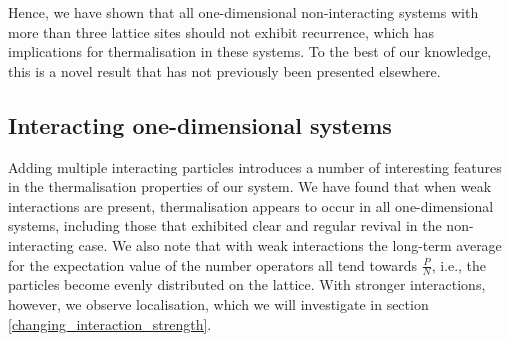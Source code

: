 \documentclass[prb, twocolumn, final]{revtex4-1}
\theoremstyle{plain}
\begin{document}
Hence, we have shown that all one-dimensional non-interacting systems with more
than three lattice sites should not exhibit recurrence, which has implications
for thermalisation in these systems. To the best of our knowledge, this is a
novel result that has not previously been presented elsewhere.


\subsection{Interacting one-dimensional systems}

Adding multiple interacting particles introduces a number of interesting
features in the thermalisation properties of our system. We have found that when
weak interactions are present, thermalisation appears to occur in all
one-dimensional systems, including those that exhibited clear and regular
revival in the non-interacting case. We also note that with weak interactions the
long-term average for the expectation value of the number operators all tend
towards $\frac{P}{N}$, i.e., the particles become evenly distributed on the
lattice. With stronger interactions, however, we observe localisation, which we
will investigate in section \ref{changing_interaction_strength}.
\end{document}
